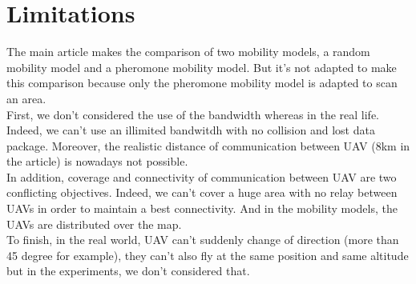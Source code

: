 \chapter{Limitations}

The main article \cite{UAV} makes the comparison of two mobility models, a random mobility model and a pheromone mobility model. But it's not adapted to make this comparison because only the pheromone mobility model is adapted to scan an area.\\

First, we don't considered the use of the bandwidth whereas in the real life. Indeed, we can't use an illimited bandwitdh with no collision and lost data package.
Moreover, the realistic distance of communication between UAV (8km in the article) is nowadays not possible. \\

In addition, coverage and connectivity of communication between UAV are two conflicting objectives. Indeed, we can't cover a huge area with no relay between UAVs in order to maintain a best connectivity. And in the mobility models, the UAVs are distributed over the map.\\

To finish, in the real world, UAV can't suddenly change of direction (more than 45 degree for example), they can't also fly at the same position and same altitude but in the experiments, we don't considered that.